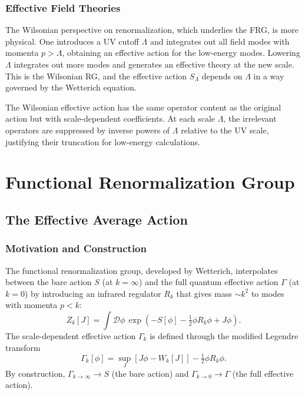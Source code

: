 \documentclass[12pt,a4paper,oneside]{book}
\theoremstyle{definition}
\theoremstyle{plain}
\theoremstyle{remark}
\begin{document}
\section{Effective Field Theories}

The Wilsonian perspective on renormalization, which underlies the FRG, is more
physical. One introduces a UV cutoff $\Lambda$ and integrates out all field
modes with momenta $p > \Lambda$, obtaining an effective action for the
low-energy modes. Lowering $\Lambda$ integrates out more modes and generates
an effective theory at the new scale. This is the Wilsonian RG, and the
effective action $S_\Lambda$ depends on $\Lambda$ in a way governed by
the Wetterich equation.

The Wilsonian effective action has the same operator content as the original
action but with scale-dependent coefficients. At each scale $\Lambda$, the
irrelevant operators are suppressed by inverse powers of $\Lambda$ relative
to the UV scale, justifying their truncation for low-energy calculations.

\part{Functional Renormalization Group}

\chapter{The Effective Average Action}

\section{Motivation and Construction}

The functional renormalization group, developed by Wetterich, interpolates
between the bare action $S$ (at $k = \infty$) and the full quantum effective
action $\Gamma$ (at $k = 0$) by introducing an infrared regulator $R_k$ that
gives mass $\sim k^2$ to modes with momenta $p < k$:
\begin{equation}
Z_k[J] = \int\mathcal{D}\phi\,\exp\!\left(-S[\phi] - \tfrac{1}{2}\phi R_k\phi + J\phi\right).
\end{equation}
The scale-dependent effective action $\Gamma_k$ is defined through the modified
Legendre transform
\begin{equation}
\Gamma_k[\phi] = \sup_J\left[J\phi - W_k[J]\right] - \tfrac{1}{2}\phi R_k\phi.
\end{equation}
By construction, $\Gamma_{k\to\infty} \to S$ (the bare action) and
$\Gamma_{k\to 0} \to \Gamma$ (the full effective action).
\end{document}
